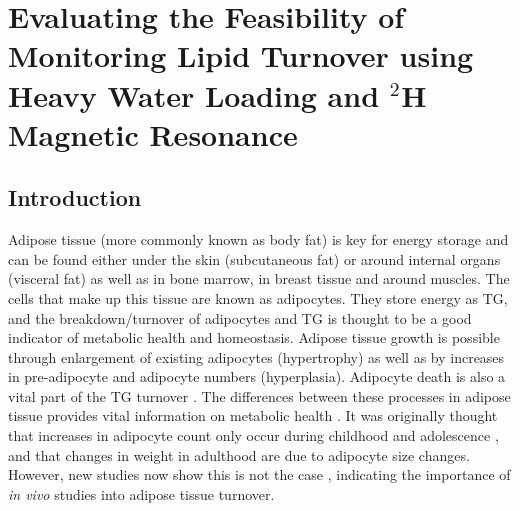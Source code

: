 \chapter{Evaluating the Feasibility of Monitoring Lipid Turnover using Heavy Water Loading and $^2$H Magnetic Resonance}
\label{Chap:Lipid}

\section{Introduction}

Adipose tissue (more commonly known as body fat) is key for energy storage and can be found either under the skin (subcutaneous fat) or around internal organs (visceral fat) as well as in bone marrow, in breast tissue and around muscles. The cells that make up this tissue are known as adipocytes. They store energy as \ac{TG}, and the breakdown/turnover of adipocytes and \ac{TG} is thought to be a good indicator of metabolic health and homeostasis. Adipose tissue growth is possible through enlargement of existing adipocytes (hypertrophy) as well as by increases in pre-adipocyte and adipocyte numbers (hyperplasia). Adipocyte death is also a vital part of the \ac{TG} turnover \cite{White2019DynamicsDisease}. The differences between these processes in adipose tissue provides vital information on metabolic health \cite{Carnethon2002Serum19871998}. It was originally thought that increases in adipocyte count only occur during childhood and adolescence \cite{Salans1973StudiesPatients}, and that changes in weight in adulthood are due to adipocyte size changes. However, new studies now show this is not the case \cite{White2016DifferencesWomen}, indicating the importance of \textit{in vivo} studies into adipose tissue turnover.

